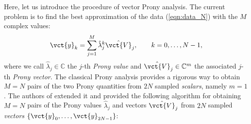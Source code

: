 \documentclass[a4paper,10pt]{article}
\def\bbC{{\mathbb{C}}}
\begin{document}
%
Here, let us introduce the procedure of vector Prony analysis.  
The current problem is to find the best approximation of the data (\ref{eqn:data_N}) with the $M$ complex values:
\begin{equation}
\vct{y}_k=\sum_{j=1}^{M}\hat{\lambda}^k_j\hat{\vct{V}}_j,\makebox[2em]{}
k=0,\ldots,N-1,
\end{equation}
where we call $\hat{\lambda}_j\in\bbC$ the $j$-th \emph{Prony value} and $\hat{\vct{V}}_j\in\bbC^m$ the associated $j$-th \emph{Prony vector}.  
The classical Prony analysis provides a rigorous way to obtain $M=N$ pairs of the two Prony quantities from $2N$ sampled \emph{scalars}, namely $m=1$.
The authors of \cite{Susuki_CDC15} extended it and provided the following algorithm for obtaining $M=N$ pairs of the Prony values $\hat{\lambda}_j$ and vectors $\hat{\vct{V}}_j$ from $2N$ sampled \emph{vectors} $\{\vct{y}_0,\ldots,\vct{y}_{2N-1}\}$:  
%
\end{document}
